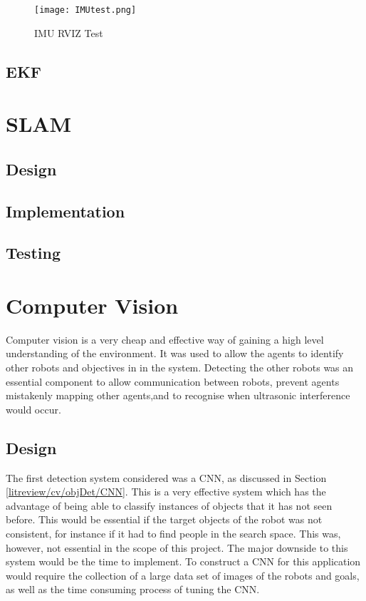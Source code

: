 \begin{figure}[!ht]
	\centering
	\texttt{[image: IMUtest.png]}
	\caption{IMU RVIZ Test}\label{fig:imu_test}
\end{figure}

\subsection{EKF}\label{soft/odometry/test}


\section{SLAM}\label{soft/SLAM}

\subsection{Design}\label{soft/SLAM/design}

\subsection{Implementation}\label{soft/SLAM/impl}

\subsection{Testing}\label{soft/SLAM/test}



\section{Computer Vision}\label{soft/cv}
Computer vision is a very cheap and effective way of gaining a high level understanding of the environment. It was used to allow the agents to identify other robots and objectives in in the system. Detecting the other robots was an essential component to allow communication between robots, prevent agents mistakenly mapping other agents,and to recognise when ultrasonic interference would occur. 

\subsection{Design}\label{soft/cv/design}
The first detection system considered was a CNN, as discussed in Section \ref{litreview/cv/objDet/CNN}. This is a very effective system which has the advantage of 
being able to classify instances of objects that it has not 
seen before. This would be essential if the target objects of 
the robot was not consistent, for instance if it had to find 
people in the search space. This was, however, not essential 
in the scope of this project. The major downside to this 
system would be the time to implement. To construct a CNN for 
this application would require the collection of a large data 
set of images of the robots and goals, as well as the time 
consuming process of tuning the CNN. 

